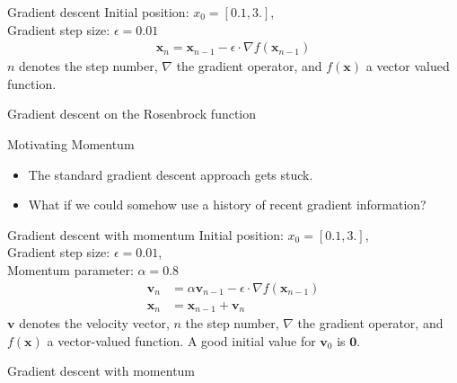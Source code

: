 \documentclass{beamer}
\begin{document}
    \begin{frame}{Gradient descent}
      Initial position: $x_0 = [0.1, 3.]$, \\
      Gradient step size: $\epsilon = 0.01 $
      \begin{align}
        \mathbf{x}_n = \mathbf{x}_{n-1} - \epsilon \cdot \nabla f(\mathbf{x}_{n-1})
      \end{align}
      $n$ denotes the step number, $\nabla$ the gradient operator, and $f(\mathbf{x})$ a vector valued function.
    \end{frame}

    \begin{frame}{Gradient descent on the Rosenbrock function}
      \centering
    \end{frame}

    \begin{frame}{Motivating Momentum}
      \begin{itemize}
        \item The standard gradient descent approach gets stuck.
        \item What if we could somehow use a history of recent gradient information?
      \end{itemize}
    \end{frame}

    \begin{frame}{Gradient descent with momentum}
      Initial position: $x_0 = [0.1, 3.]$, \\
      Gradient step size: $\epsilon = 0.01 $, \\
      Momentum parameter: $\alpha = 0.8$
      \begin{align}
        \mathbf{v}_n &= \alpha \mathbf{v}_{n-1} - \epsilon \cdot \nabla f(\mathbf{x}_{n-1}) \\
        \mathbf{x}_n &= \mathbf{x}_{n-1} + \mathbf{v}_n
      \end{align}
      $\mathbf{v}$ denotes the velocity vector, 
      $n$ the step number, $\nabla$ the gradient operator, and $f(\mathbf{x})$ a vector-valued function.
      A good initial value for $\mathbf{v}_0$ is $\mathbf{0}$.
    \end{frame}


    \begin{frame}{Gradient descent with momentum}
      \centering
    \end{frame}
\end{document}
